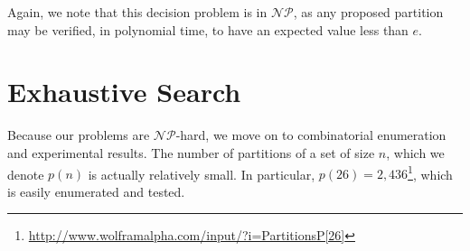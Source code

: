 \documentclass[runningheads]{llncs}
\newcommand{\NP}{\ensuremath{\mathcal{NP}}}
\begin{document}
Again, we note that this decision problem is in \NP, as any proposed partition may be verified, in polynomial time, to have an expected value less than $e$.

\section{Exhaustive Search}

Because our problems are \NP-hard, we move on to combinatorial enumeration and experimental results.  The number of partitions of a set of size $n$, which we denote $p(n)$ is actually relatively small.  In particular, $p(26) = 2,436$\footnote{\url{http://www.wolframalpha.com/input/?i=PartitionsP[26]}}, which is easily enumerated and tested.



\end{document}
